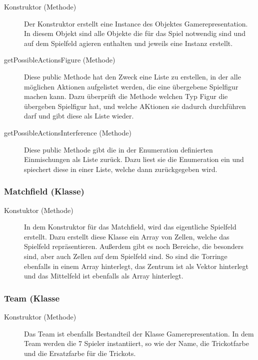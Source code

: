 		\begin{description}
                
			\item[Konstruktor (Methode)]
			Der Konstruktor erstellt eine Instance des Objektes Gamerepresentation. In diesem Objekt sind alle Objekte die für das Spiel notwendig sind und auf dem Spielfeld agieren enthalten und jeweils eine Instanz erstellt.
                
        	\item[getPossibleActionsFigure (Methode)]
        	Diese public Methode hat den Zweck eine Liste zu erstellen, in der alle möglichen Aktionen aufgelistet werden, die eine übergebene Spielfigur machen kann. Dazu überprüft die Methode welchen Typ Figur die übergeben Spielfigur hat, und welche AKtionen sie dadurch durchführen darf und gibt diese als Liste wieder.
        	
        	\item[getPossibleActionsInterference (Methode)]
        	Diese public Methode gibt die in der Enumeration definierten Einmischungen als Liste zurück. Dazu liest sie die Enumeration ein und spiechert diese in einer Liste, welche dann zurückgegeben wird. 
        \end{description}
        	
        \subsubsection{Matchfield (Klasse)}
        \begin{description}
        	\item[Konstuktor (Methode)]
        	In dem Konstruktor für das Matchfield, wird das eigentliche Spielfeld erstellt. Dazu erstellt diese Klasse ein Array von Zellen, welche das Spielfeld repräsentieren. Außerdem gibt es noch Bereiche, die besonders sind, aber auch Zellen auf dem Spielfeld sind. So sind die Torringe ebenfalls in einem Array hinterlegt, das Zentrum ist als Vektor hinterlegt und das Mittelfeld ist ebenfalls als Array hinterlegt.
        \end{description}
        
        \subsubsection{Team (Klasse}
        \begin{description}
        	\item[Konstruktor (Methode)]
        	Das Team ist ebenfalls Bestandteil der Klasse Gamerepresentation. In dem Team werden die 7 Spieler instantiiert, so wie der Name, die Trickotfarbe und die Ersatzfarbe für die Trickots.
        \end{description}
        
